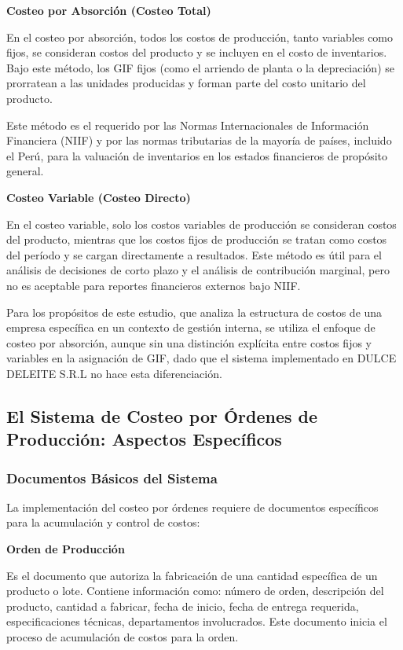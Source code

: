 \documentclass[
  stu,
  floatsintext,
  longtable,
  a4paper,
  nolmodern,
  notxfonts,
  notimes,
  12pt,
  colorlinks=true,linkcolor=blue,citecolor=blue,urlcolor=blue]{apa7}
\begin{document}
\textbf{Costeo por Absorción (Costeo Total)}

En el costeo por absorción, todos los costos de producción, tanto
variables como fijos, se consideran costos del producto y se incluyen en
el costo de inventarios. Bajo este método, los GIF fijos (como el
arriendo de planta o la depreciación) se prorratean a las unidades
producidas y forman parte del costo unitario del producto.

Este método es el requerido por las Normas Internacionales de
Información Financiera (NIIF) y por las normas tributarias de la mayoría
de países, incluido el Perú, para la valuación de inventarios en los
estados financieros de propósito general.

\textbf{Costeo Variable (Costeo Directo)}

En el costeo variable, solo los costos variables de producción se
consideran costos del producto, mientras que los costos fijos de
producción se tratan como costos del período y se cargan directamente a
resultados. Este método es útil para el análisis de decisiones de corto
plazo y el análisis de contribución marginal, pero no es aceptable para
reportes financieros externos bajo NIIF.

Para los propósitos de este estudio, que analiza la estructura de costos
de una empresa específica en un contexto de gestión interna, se utiliza
el enfoque de costeo por absorción, aunque sin una distinción explícita
entre costos fijos y variables en la asignación de GIF, dado que el
sistema implementado en DULCE DELEITE S.R.L no hace esta diferenciación.

\subsection{El Sistema de Costeo por Órdenes de Producción: Aspectos
Específicos}\label{el-sistema-de-costeo-por-uxf3rdenes-de-producciuxf3n-aspectos-especuxedficos}

\subsubsection{Documentos Básicos del
Sistema}\label{documentos-buxe1sicos-del-sistema}

La implementación del costeo por órdenes requiere de documentos
específicos para la acumulación y control de costos:

\textbf{Orden de Producción}

Es el documento que autoriza la fabricación de una cantidad específica
de un producto o lote. Contiene información como: número de orden,
descripción del producto, cantidad a fabricar, fecha de inicio, fecha de
entrega requerida, especificaciones técnicas, departamentos
involucrados. Este documento inicia el proceso de acumulación de costos
para la orden.
\end{document}
